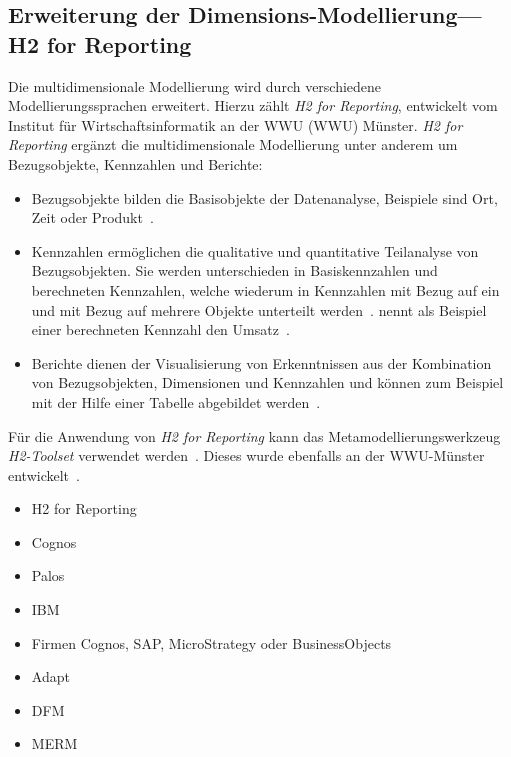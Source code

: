 \documentclass[
  language=german, %
  type=bachelor%
]{isthesis}
\begin{document}
\begin{content}
  \section{Erweiterung der Dimensions-Modellierung---H2 for Reporting}
  Die multidimensionale Modellierung wird durch verschiedene Modellierungssprachen
  erweitert. Hierzu zählt \zB{} \textit{H2 for Reporting}, entwickelt vom
  Institut für Wirtschaftsinformatik an der \acrlong{WWU} (WWU)
  Münster. \textit{H2 for Reporting}
  ergänzt die multidimensionale Modellierung unter anderem um Bezugsobjekte,
  Kennzahlen und Berichte:
  \begin{itemize}
    \item Bezugsobjekte bilden die
      Basisobjekte der Datenanalyse, Beispiele sind Ort, Zeit oder
      Produkt~\cite[][S.  5]{becker2007h2}. 
    \item Kennzahlen ermöglichen die qualitative
      und quantitative Teilanalyse von Bezugsobjekten. Sie werden unterschieden in
      Basiskennzahlen und berechneten Kennzahlen, welche wiederum in Kennzahlen mit
      Bezug auf ein und mit Bezug auf mehrere Objekte unterteilt werden~\cite[][S.
      15]{becker2007h2}. \textsc{\citeauthor{becker2007h2}} nennt als Beispiel
      einer berechneten Kennzahl den Umsatz~\cite[][S. 17]{becker2007h2}.
    \item Berichte dienen der Visualisierung von Erkenntnissen aus der Kombination von
      Bezugsobjekten, Dimensionen und Kennzahlen und können zum Beispiel mit der
      Hilfe einer Tabelle abgebildet werden~\cite[][S. 23]{becker2007h2}.
  \end{itemize}

  Für die Anwendung von \textit{H2 for Reporting} kann das
  Metamodellierungswerkzeug \textit{H2-Toolset} verwendet werden~\cite[][S.
  33]{fleischer2013konstruktion}. Dieses wurde ebenfalls an der
  \acrshort{WWU}-Münster entwickelt~\cite[][S. 34]{becker2007h2}.

  \begin{itemize}
    \item H2 for Reporting
    \item Cognos
    \item Palos
    \item IBM
    \item Firmen Cognos, SAP, MicroStrategy oder BusinessObjects
    \item Adapt
    \item DFM
    \item MERM
  \end{itemize}


\end{content}
\end{document}
